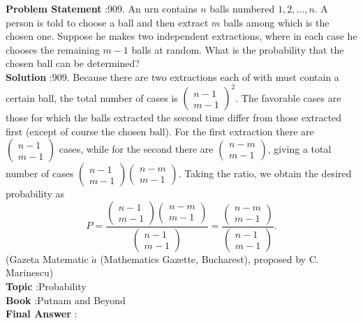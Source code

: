 \documentclass[10pt]{article}
\begin{document}
\textbf{Problem Statement} :909. An urn contains $n$ balls numbered $1,2, \ldots, n$. A person is told to choose a ball and then extract $m$ balls among which is the chosen one. Suppose he makes two independent extractions, where in each case he chooses the remaining $m-1$ balls at random. What is the probability that the chosen ball can be determined?\\
\textbf{Solution} :909. Because there are two extractions each of with must contain a certain ball, the total number of cases is $\left(\begin{array}{c}n-1 \\ m-1\end{array}\right)^{2}$. The favorable cases are those for which the balls extracted the second time differ from those extracted first (except of course the chosen ball). For the first extraction there are $\left(\begin{array}{c}n-1 \\ m-1\end{array}\right)$ cases, while for the second there are $\left(\begin{array}{c}n-m \\ m-1\end{array}\right)$, giving a total number of cases $\left(\begin{array}{c}n-1 \\ m-1\end{array}\right)\left(\begin{array}{c}n-m \\ m-1\end{array}\right)$. Taking the ratio, we obtain the desired probability as$$ P=\frac{\left(\begin{array}{c} n-1 \\ m-1 \end{array}\right)\left(\begin{array}{c} n-m \\ m-1 \end{array}\right)}{\left(\begin{array}{c} n-1 \\ m-1 \end{array}\right)}=\frac{\left(\begin{array}{c} n-m \\ m-1 \end{array}\right)}{\left(\begin{array}{c} n-1 \\ m-1 \end{array}\right)} . $$(Gazeta Matematic $\breve{a}$ (Mathematics Gazette, Bucharest), proposed by C. Marinescu)\\
\textbf{Topic} :Probability\\
\textbf{Book} :Putnam and Beyond\\
\textbf{Final Answer} :\\
\end{document}
